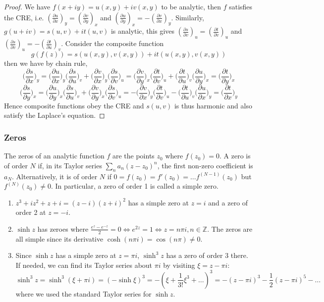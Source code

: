 \documentclass[a4paper]{article}
\begin{document}
\begin{proof}
We have $f(x+iy)=u(x,y)+iv(x,y)$ to be analytic, then $f$ satisfies the CRE, i.e. $(\frac{\partial u}{\partial x})_y=(\frac{\partial v}{\partial y})_x$ and $(\frac{\partial u}{\partial y})_x=-(\frac{\partial v}{\partial x})_y$. Similarly, $g(u+iv)=s(u,v)+it(u,v)$ is analytic, this gives $(\frac{\partial s}{\partial v})_u=(\frac{\partial t}{\partial v})_u$ and $(\frac{\partial s}{\partial v})_u=-(\frac{\partial t}{\partial u})_v$. Consider the composite function
$$g(f(z))=s(u(x,y),v(x,y))+it(u(x,y),v(x,y))$$
then we have by chain rule,
$$\bigg(\frac{\partial s}{\partial x}\bigg)_y=\bigg(\frac{\partial u}{\partial x}\bigg)_y\bigg(\frac{\partial s}{\partial u}\bigg)_v+\bigg(\frac{\partial v}{\partial x}\bigg)_y\bigg(\frac{\partial s}{\partial v}\bigg)_u=\bigg(\frac{\partial v}{\partial y}\bigg)_x\bigg(\frac{\partial t}{\partial v}\bigg)_u+\bigg(\frac{\partial t}{\partial u}\bigg)_v\bigg(\frac{\partial u}{\partial y}\bigg)_x=\bigg(\frac{\partial t}{\partial y}\bigg)_x$$
$$\bigg(\frac{\partial s}{\partial y}\bigg)_x=\bigg(\frac{\partial u}{\partial y}\bigg)_x\bigg(\frac{\partial s}{\partial u}\bigg)_v+\bigg(\frac{\partial v}{\partial y}\bigg)_x\bigg(\frac{\partial s}{\partial v}\bigg)_u=-\bigg(\frac{\partial v}{\partial x}\bigg)_y\bigg(\frac{\partial t}{\partial v}\bigg)_u-\bigg(\frac{\partial t}{\partial u}\bigg)_v\bigg(\frac{\partial u}{\partial x}\bigg)_y=\bigg(\frac{\partial t}{\partial x}\bigg)_y$$
Hence composite functions obey the CRE and $s(u,v)$ is thus harmonic and also satisfy the Laplace's equation.
\end{proof}
\subsubsection{Zeros}
\begin{defi}[Zero]
The zeros of an analytic function $f$ are the points $z_0$ where $f(z_0)=0$. A zero is of order $N$ if, in its Taylor series $\sum_na_n(z-z_0)^n$, the first non-zero coefficient is $a_N$. Alternatively, it is of order $N$ if $0=f(z_0)=f'(z_0)=\dots f^{(N-1)}(z_0)$ but $f^{(N)}(z_0)\neq 0$. In particular, a zero of order 1 is called a simple zero.
\end{defi}
\begin{eg}\leavevmode
\begin{enumerate}
    \item $z^3+iz^2+z+i=(z-i)(z+i)^2$ has a simple zero at $z=i$ and a zero of order 2 at $z=-i$.
    \item $\sinh z$ has zeroes where $\frac{e^z-e^{-z}}{2}=0\iff e^{2z}=1\iff z=n\pi i,n\in\mathbb{Z}$. The zeros are all simple since its derivative $\cosh(n\pi i)=\cos(n\pi)\neq 0$.
    \item Since $\sinh z$ has a simple zero at $z=\pi i$, $\sinh^3z$ has a zero of order 3 there. If needed, we can find its Taylor series about $\pi i$ by visiting $\xi=z-\pi i$:
    $$\sinh^3z=\sinh^3(\xi+\pi i)=(-\sinh\xi)^3=-(\xi+\frac{1}{3!}\xi^3+\dots)^3=-(z-\pi i)^3-\frac{1}{2}(z-\pi i)^5-\dots$$
    where we used the standard Taylor series for $\sinh z$.
\end{enumerate}
\end{eg}
\end{document}
